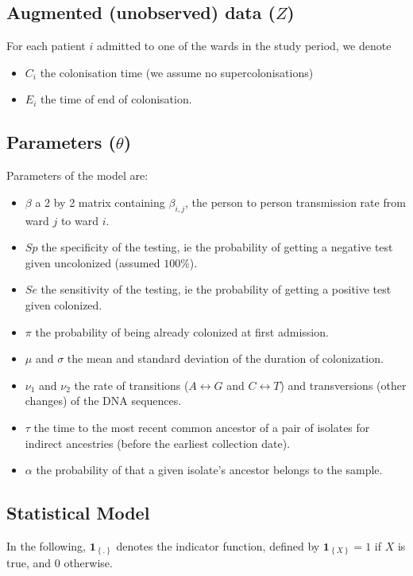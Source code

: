 \documentclass[10pt]{article}
\begin{document}
\subsection*{Augmented (unobserved) data ($Z$)}

For each patient $i$ admitted to one of the wards in the study period, we denote 
\begin{itemize}
	\item $C_i$ the colonisation time (we assume no supercolonisations)
	\item $E_i$ the time of end of colonisation.
\end{itemize}

\subsection*{Parameters ($\theta$)}

Parameters of the model are: 
\begin{itemize}
	\item $\beta$ a 2 by 2 matrix containing $\beta_{i,j}$, the person to person transmission rate from ward $j$ to ward $i$.
	\item $Sp$ the specificity of the testing, ie the probability of getting a negative test given uncolonized (assumed $100\%$).
	\item $Se$ the sensitivity of the testing, ie the probability of getting a positive test given colonized.
	\item $\pi$ the probability of being already colonized at first admission.
	\item $\mu$ and $\sigma$ the mean and standard deviation of the duration of colonization.
	\item $\nu_1$ and $\nu_2$ the rate of transitions ($A \leftrightarrow G$ and $C \leftrightarrow T$) and transversions (other changes) of the DNA sequences.
	\item $\tau$ the time to the most recent common ancestor of a pair of isolates for indirect ancestries (before the earliest collection date).
	\item $\alpha$ the probability of that a given isolate's ancestor belongs to the sample.
\end{itemize}

\subsection*{Statistical Model}

In the following, $\mathbf{1}_{\left\lbrace.\right\rbrace}$ denotes the indicator function, defined by $\mathbf{1}_{\left\lbrace X \right\rbrace}=1$ if $X$ is true, and $0$ otherwise.
\end{document}
